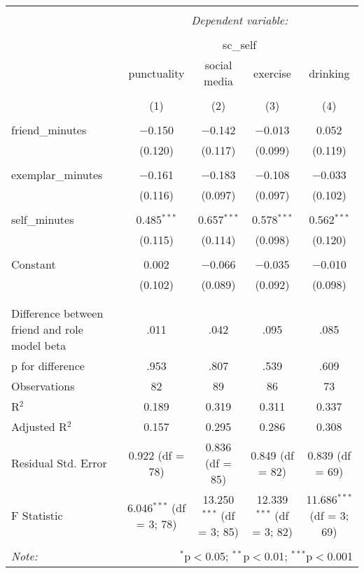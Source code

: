 
\begin{table}[!htbp] \centering 
  \caption{} 
  \label{} 
\begin{tabular}{@{\extracolsep{5pt}}lcccc} 
\\[-1.8ex]\hline 
\hline \\[-1.8ex] 
 & \multicolumn{4}{c}{\textit{Dependent variable:}} \\ 
\cline{2-5} 
\\[-1.8ex] & \multicolumn{4}{c}{sc\_self} \\ 
 & punctuality & social media & exercise & drinking \\ 
\\[-1.8ex] & (1) & (2) & (3) & (4)\\ 
\hline \\[-1.8ex] 
 friend\_minutes & $-$0.150 & $-$0.142 & $-$0.013 & 0.052 \\ 
  & (0.120) & (0.117) & (0.099) & (0.119) \\ 
  & & & & \\ 
 exemplar\_minutes & $-$0.161 & $-$0.183 & $-$0.108 & $-$0.033 \\ 
  & (0.116) & (0.097) & (0.097) & (0.102) \\ 
  & & & & \\ 
 self\_minutes & 0.485$^{***}$ & 0.657$^{***}$ & 0.578$^{***}$ & 0.562$^{***}$ \\ 
  & (0.115) & (0.114) & (0.098) & (0.120) \\ 
  & & & & \\ 
 Constant & 0.002 & $-$0.066 & $-$0.035 & $-$0.010 \\ 
  & (0.102) & (0.089) & (0.092) & (0.098) \\ 
  & & & & \\ 
\hline \\[-1.8ex] 
Difference between friend and role model beta & .011 & .042 & .095 & .085 \\ 
p for difference & .953 & .807 & .539 & .609 \\ 
Observations & 82 & 89 & 86 & 73 \\ 
R$^{2}$ & 0.189 & 0.319 & 0.311 & 0.337 \\ 
Adjusted R$^{2}$ & 0.157 & 0.295 & 0.286 & 0.308 \\ 
Residual Std. Error & 0.922 (df = 78) & 0.836 (df = 85) & 0.849 (df = 82) & 0.839 (df = 69) \\ 
F Statistic & 6.046$^{***}$ (df = 3; 78) & 13.250$^{***}$ (df = 3; 85) & 12.339$^{***}$ (df = 3; 82) & 11.686$^{***}$ (df = 3; 69) \\ 
\hline 
\hline \\[-1.8ex] 
\textit{Note:}  & \multicolumn{4}{r}{$^{*}$p$<$0.05; $^{**}$p$<$0.01; $^{***}$p$<$0.001} \\ 
\end{tabular} 
\end{table} 
